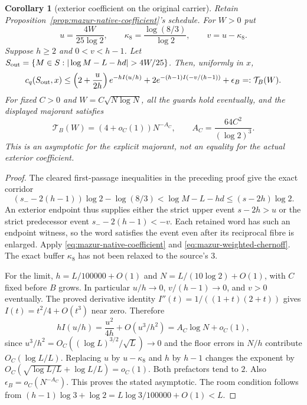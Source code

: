 \documentclass[11pt]{article}
\newtheorem{corollary}[proposition]{Corollary}
\theoremstyle{remark}\newtheorem{remark}[proposition]{Remark}
\begin{document}
\begin{corollary}[exterior coefficient on the original carrier]
\label{cor:mazur-exterior-coefficient}
Retain Proposition~\ref{prop:mazur-native-coefficient}'s schedule.
For $W>0$ put
\[
 u=\frac{4W}{25\log2},\qquad
 \kappa_8=\frac{\log(8/3)}{\log2},\qquad v=u-\kappa_8.
\]
Suppose $h\ge2$ and $0<v<h-1$. Let
$S_{\rm out}=\{M\in S:|\log M-L-hd|>4W/25\}$.
Then, uniformly in $x$,
\begin{equation}
 c_q(S_{\rm out},x)\le
 \left(2+\frac{u}{2h}\right)e^{-hI(u/h)}
 +2e^{-(h-1)I(-v/(h-1))}+\epsilon_B
 =:\mathcal T_B(W).
 \label{eq:mazur-exterior-finite}
\end{equation}
For fixed $C>0$ and $W=C\sqrt{N\log N}$, all the guards hold eventually,
and the displayed majorant satisfies
\begin{equation}
 \mathcal T_B(W)=(4+o_C(1))N^{-A_C},\qquad
 A_C=\frac{64C^2}{(\log2)^3}.
 \label{eq:mazur-exterior-rate}
\end{equation}
This is an asymptotic for the explicit majorant, not an equality for
the actual exterior coefficient.
\end{corollary}
\begin{proof}
The cleared first-passage inequalities in the preceding proof give
the exact corridor
\[
 (s_--2(h-1))\log2-\log(8/3)
 <\log M-L-hd\le(s-2h)\log2 .
\]
An exterior endpoint thus supplies either the strict upper event
$s-2h>u$ or the strict predecessor event $s_--2(h-1)<-v$.
Each retained word has such an endpoint witness, so the word satisfies
the event even after its reciprocal fibre is enlarged.
Apply \eqref{eq:mazur-native-coefficient} and
\eqref{eq:mazur-weighted-chernoff}. The exact buffer $\kappa_8$
has not been relaxed to the source's $3$.

For the limit, $h=L/100000+O(1)$ and
$N=L/(10\log2)+O(1)$, with $C$ fixed before $B$ grows.
In particular $u/h\to0$, $v/(h-1)\to0$, and $v>0$ eventually.
The proved derivative identity $I''(t)=1/((1+t)(2+t))$ gives
$I(t)=t^2/4+O(t^3)$ near zero. Therefore
\[
 hI(u/h)=\frac{u^2}{4h}+O(u^3/h^2)
        =A_C\log N+o_C(1),
\]
since $u^3/h^2=O_C((\log L)^{3/2}/\sqrt L)\to0$ and the floor
errors in $N/h$ contribute $O_C(\log L/L)$.
Replacing $u$ by $u-\kappa_8$ and $h$ by $h-1$ changes the
exponent by $O_C(\sqrt{\log L/L}+\log L/L)=o_C(1)$.
Both prefactors tend to $2$. Also
$\epsilon_B=o_C(N^{-A_C})$. This proves the stated asymptotic.
The room condition follows from
$(h-1)\log3+\log2=L\log3/100000+O(1)<L$.
\end{proof}
\end{document}
